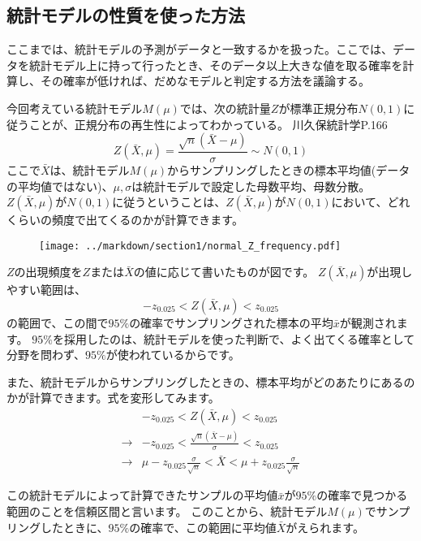 \documentclass[a4paper,11pt,dvipdfmx]{jsarticle}
\begin{document}
\subsection{統計モデルの性質を使った方法}
ここまでは、統計モデルの予測がデータと一致するかを扱った。ここでは、データを統計モデル上に持って行ったとき、そのデータ以上大きな値を取る確率を計算し、その確率が低ければ、だめなモデルと判定する方法を議論する。

今回考えている統計モデル$M(\mu)$では、次の統計量$Z$が標準正規分布$N(0,1)$に従うことが、正規分布の再生性によってわかっている。
 川久保統計学P.166
 \fi
$$
Z(\bar{X},\mu)=\frac{\sqrt{n}(\bar{X}-\mu)}{\sigma} \sim N(0,1)
$$
ここで$\bar{X}$は、統計モデル$M(\mu)$からサンプリングしたときの標本平均値(データの平均値ではない)、$\mu,\sigma$は統計モデルで設定した母数平均、母数分散。
$Z(\bar{X},\mu)$が$N(0,1)$に従うということは、$Z(\bar{X},\mu)$が$N(0,1)$において、どれくらいの頻度で出てくるのかが計算できます。

\begin{figure}
\begin{center}
    \texttt{[image: ../markdown/section1/normal\_Z\_frequency.pdf]}
  \end{center}
\end{figure}

$Z$の出現頻度を$Z$または$\bar{X}$の値に応じて書いたものが図です。
$Z(\bar{X},\mu)$が出現しやすい範囲は、
$$
-z_{0.025}<Z(\bar{X},\mu)<z_{0.025}
$$
の範囲で、この間で$95\%$の確率でサンプリングされた標本の平均$\bar{x}$が観測されます。
$95\%$を採用したのは、統計モデルを使った判断で、よく出てくる確率として分野を問わず、$95\%$が使われているからです。

また、統計モデルからサンプリングしたときの、標本平均がどのあたりにあるのかが計算できます。式を変形してみます。
\begin{eqnarray*}
    & -z_{0.025} < Z(\bar{X},\mu)<z_{0.025} \\
\rightarrow & -z_{0.025} < \frac{\sqrt{n}(\bar{X}-\mu)}{\sigma}  <z_{0.025} \\
\rightarrow & \mu - z_{0.025} \frac{\sigma}{\sqrt{n}} < \bar{X} < \mu + z_{0.025} \frac{\sigma}{\sqrt{n}}
\end{eqnarray*}

この統計モデルによって計算できたサンプルの平均値$\bar{x}$が$95\%$の確率で見つかる範囲のことを信頼区間と言います。
このことから、統計モデル$M(\mu)$でサンプリングしたときに、$95\%$の確率で、この範囲に平均値$\bar{X}$がえられます。
\end{document}

